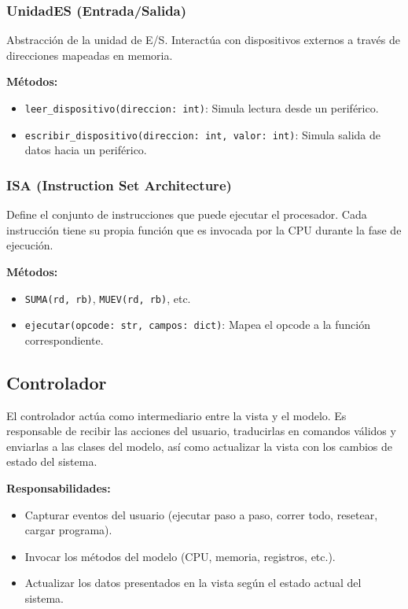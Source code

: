 \documentclass{article}
\begin{document}
\subsubsection*{UnidadES (Entrada/Salida)}

Abstracción de la unidad de E/S. Interactúa con dispositivos externos a través de direcciones 
mapeadas en memoria.

\textbf{Métodos:}
\begin{itemize}
  \item \texttt{leer\_dispositivo(direccion: int)}: Simula lectura desde un periférico.
  \item \texttt{escribir\_dispositivo(direccion: int, valor: int)}: Simula salida de datos hacia 
  un periférico.
\end{itemize}

\subsubsection*{ISA (Instruction Set Architecture)}

Define el conjunto de instrucciones que puede ejecutar el procesador. Cada instrucción tiene 
su propia función que es invocada por la CPU durante la fase de ejecución.

\textbf{Métodos:}
\begin{itemize}
  \item \texttt{SUMA(rd, rb)}, \texttt{MUEV(rd, rb)}, etc.
  \item \texttt{ejecutar(opcode: str, campos: dict)}: Mapea el opcode a la función correspondiente.
\end{itemize}


\subsection{Controlador}

El controlador actúa como intermediario entre la vista y el modelo. 
Es responsable de recibir las acciones del usuario, traducirlas en comandos válidos y 
enviarlas a las clases del modelo, así como actualizar la vista con los cambios 
de estado del sistema.

\textbf{Responsabilidades:}
\begin{itemize}
  \item Capturar eventos del usuario (ejecutar paso a paso, correr todo, resetear, cargar programa).
  \item Invocar los métodos del modelo (CPU, memoria, registros, etc.).
  \item Actualizar los datos presentados en la vista según el estado actual del sistema.
\end{itemize}
\end{document}
